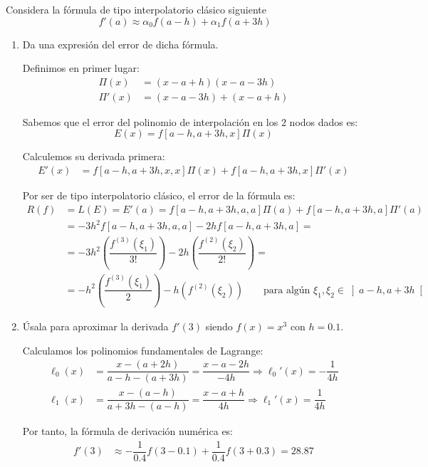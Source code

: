 \begin{ejercicio}\label{ej:2.2.3}
    Considera la fórmula de tipo interpolatorio clásico siguiente
    \[
    f'(a) \approx \alpha_0 f(a - h) + \alpha_1 f(a + 3h)
    \]
    \begin{enumerate}
        \item Da una expresión del error de dicha fórmula.

        Definimos en primer lugar:
        \begin{align*}
            \Pi(x) &= (x-a+h)(x-a-3h)\\
            \Pi'(x) &= (x-a-3h) + (x-a+h)
        \end{align*}

        Sabemos que el error del polinomio de interpolación en los $2$ nodos dados es:
        \begin{equation*}
            E(x) = f[a-h, a+3h, x]\Pi(x)
        \end{equation*}

        Calculemos su derivada primera:
        \begin{align*}
            E'(x) &= f[a-h, a+3h, x, x]\Pi(x) + f[a-h, a+3h, x]\Pi'(x)
        \end{align*}

        Por ser de tipo interpolatorio clásico, el error de la fórmula es:
        \begin{align*}
            R(f) &= L(E) = E'(a) = f[a-h, a+3h, a,a]\Pi(a) + f[a-h, a+3h, a]\Pi'(a)\\
            &= -3h^2f[a-h, a+3h, a,a]-2hf[a-h, a+3h, a]
            =\\&= -3h^2\left(\dfrac{f^{(3)}(\xi_1)}{3!}\right)-2h\left(\dfrac{f^{(2)}(\xi_2)}{2!}\right)
            =\\&= -h^2\left(\dfrac{f^{(3)}(\xi_1)}{2}\right)-h\left(f^{(2)}(\xi_2)\right)\qquad \text{para algún }\xi_1,\xi_2\in\left]a-h,a+3h\right[
        \end{align*}


        
        \item Úsala para aproximar la derivada $f'(3)$ siendo $f(x) = x^3$ con $h = 0.1$.
        
        Calculamos los polinomios fundamentales de Lagrange:
        \begin{align*}
            \ell_0(x) &= \dfrac{x-(a+2h)}{a-h-(a+3h)} = \dfrac{x-a-2h}{-4h}
            \Longrightarrow \ell_0'(x) = -\dfrac{1}{4h} \\
            \ell_1(x) &= \dfrac{x-(a-h)}{a+3h-(a-h)} = \dfrac{x-a+h}{4h}
            \Longrightarrow \ell_1'(x) = \dfrac{1}{4h}
        \end{align*}

        Por tanto, la fórmula de derivación numérica es:
        \begin{align*}
            f'(3) &\approx -\dfrac{1}{0.4}f(3-0.1) + \dfrac{1}{0.4}f(3+0.3) = 28.87
        \end{align*}
    \end{enumerate}
\end{ejercicio}

